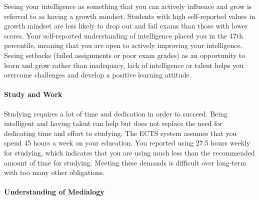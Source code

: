 \documentclass[]{article}
\let\oldparagraph\paragraph
\renewcommand{\paragraph}[1]{\oldparagraph{#1}\mbox{}}
\begin{document}
Seeing your intelligence as something that you can actively influence
and grow is referred to as having a growth mindset. Students with high
self-reported values in growth mindset are less likely to drop out and
fail exams than those with lower scores. Your self-reported
understanding of intelligence placed you in the 47th percentile, meaning
that you are open to actively improving your intelligence. Seeing
setbacks (failed assignments or poor exam grades) as an opportunity to
learn and grow rather than inadequacy, lack of intelligence or talent
helps you overcome challenges and develop a positive learning attitude.

\paragraph{Study and Work}\label{study-and-work}

Studying requires a lot of time and dedication in order to succeed.
Being intelligent and having talent can help but does not replace the
need for dedicating time and effort to studying. The ECTS system assumes
that you spend 45 hours a week on your education. You reported using
27.5 hours weekly for studying, which indicates that you are using much
less than the recommended amount of time for studying. Meeting these
demands is difficult over long-term with too many other obligations.

\paragraph{Understanding of Medialogy}\label{understanding-of-medialogy}
\end{document}
